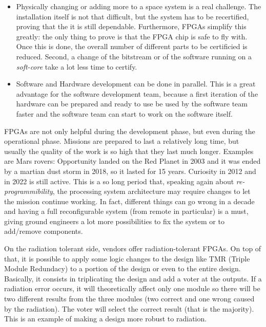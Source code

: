 \begin{itemize}
    \item Physically changing or adding more to a space system is a real challenge. The installation itself is not that difficult, but the system has to be recertified, proving that the it is still dependable. Furthermore, FPGAs simplify this greatly: the only thing to prove is that the FPGA chip is safe to fly with. Once this is done, the overall number of different parts to be certificied is reduced. Second, a change of the bitstream or of the software running on a \textit{soft-core} take a lot less time to certify.
    \item Software and Hardware development can be done in parallel. This is a great advantage for the software development team, because a first iteration of the hardware can be prepared and ready to use be used by the software team faster and the software team can start to work on the software itself.
\end{itemize}

FPGAs are not only helpful during the development phase, but even during the operational phase. Missions are prepared to last a relatively long time, but usually the quality of the work is so high that they last much longer. Examples are Mars rovers: Opportunity landed on the Red Planet in 2003 and it was ended by a martian dust storm in 2018, so it lasted for 15 years. Curiosity in 2012 and in 2022 is still active. This is a so long period that, speaking again about \textit{re-programmibility}, the processing system architecture may require changes to let the mission continue working. In fact, different things can go wrong in a decade and having a full reconfigurable system (from remote in particular) is a must, giving ground engineers a lot more possibilities to fix the system or to add/remove components. \bigskip

On the radiation tolerant side, vendors offer radiation-tolerant FPGAs. On top of that, it is possible to apply some logic changes to the design like TMR (Triple Module Redundacy) to a portion of the design or even to the entire design. Basically, it consists in triplicating the design and add a voter at the outputs. If a radiation error occurs, it will theoretically affect only one module so there will be two different results from the three modules (two correct and one wrong caused by the radiation). The voter will select the correct result (that is the majority). This is an example of making a design more robust to radiation.\bigskip

